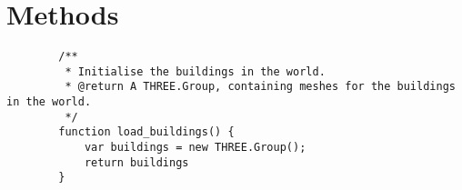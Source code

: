 \section{Methods} %
\label{sec:methods}
    \begin{verbatim}
        /**
         * Initialise the buildings in the world.
         * @return A THREE.Group, containing meshes for the buildings in the world.
         */
        function load_buildings() {
            var buildings = new THREE.Group();
            return buildings
        }
    \end{verbatim}

